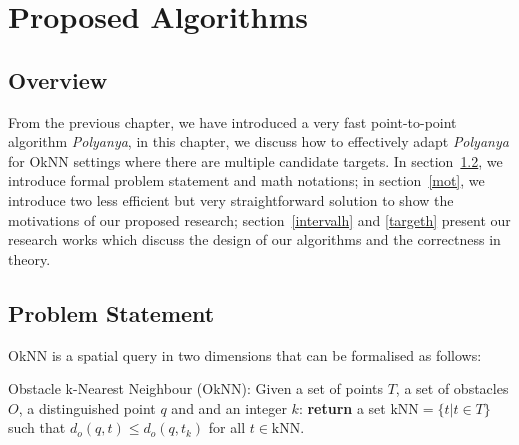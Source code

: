 \chapter{Proposed Algorithms}\label{proposedalgo}
\section{Overview}\label{proposedoverview}
From the previous chapter, we have introduced a very fast point-to-point algorithm \textit{Polyanya}, 
in this chapter, we discuss how to effectively adapt \textit{Polyanya} for OkNN settings where
there are multiple candidate targets. In section~\ref{prob}, we introduce formal problem
statement and math notations; in section~\ref{mot}, we introduce two less efficient but very
straightforward solution to show the motivations of our proposed research;
section~\ref{intervalh} and \ref{targeth} present our research works which discuss the design of our algorithms and the correctness in theory.

\section{Problem Statement}\label{prob}
OkNN is a spatial query in two dimensions that can be formalised as follows:
\begin{definition}{Obstacle k-Nearest Neighbour (OkNN):}\newline
Given a set of points $T$, a set of obstacles $O$, a distinguished point $q$ and and an integer $k$: 
\textbf{return} a set $\text{kNN} = \{t | t \in T\}$ such that $d_o(q, t) \le d_o(q, t_k)$ for all $t \in \text{kNN}$.
\end{definition}

